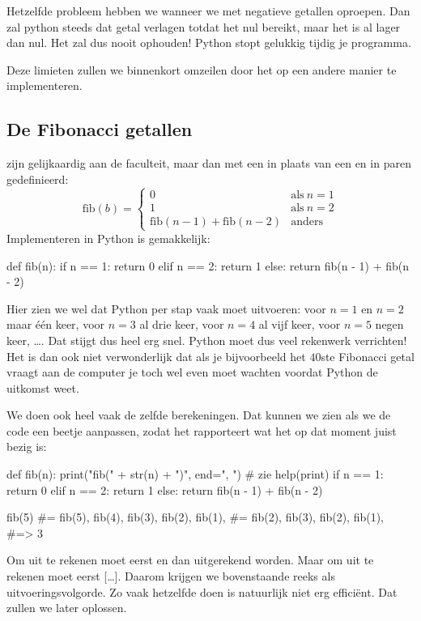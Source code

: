   Hetzelfde probleem hebben we wanneer we  met negatieve getallen
  oproepen. Dan zal python steeds dat getal verlagen totdat het nul bereikt,
  maar het is al lager dan nul. Het zal dus nooit ophouden! Python stopt
  gelukkig tijdig je programma.

  Deze limieten zullen we binnenkort omzeilen door het op een andere manier te
  implementeren.

  \subsection{De Fibonacci getallen} zijn gelijkaardig aan de faculteit, maar
  dan met een \py{+} in plaats van een \py{*} en in paren gedefinieerd:
  \begin{equation*}
    \text{fib}\left(b\right) = %
    \begin{cases}
      0                                                       & \text{als}\ n=1 \\
      1                                                       & \text{als}\ n=2 \\
      \text{fib}\left(n-1\right) + \text{fib}\left(n-2\right) & \text{anders}
    \end{cases}
  \end{equation*}
  Implementeren in Python is gemakkelijk:
  \begin{python}
    def fib(n):
      if n == 1: return 0
      elif n == 2: return 1
      else: return fib(n - 1) + fib(n - 2)
  \end{python}

  Hier zien we wel dat Python per stap vaak  moet uitvoeren: voor $n=1$
  en $n=2$ maar \'e\'en keer, voor $n=3$ al drie keer, voor $n=4$ al vijf keer,
  voor $n=5$ negen keer, \ldots. Dat stijgt dus heel erg snel. Python moet dus
  veel rekenwerk verrichten! Het is dan ook niet verwonderlijk dat als je
  bijvoorbeeld het $40$ste Fibonacci getal vraagt aan de computer je toch wel
  even moet wachten voordat Python de uitkomst weet.

  We doen ook heel vaak de zelfde berekeningen. Dat kunnen we zien als we de
  code een beetje aanpassen, zodat het rapporteert wat het op dat moment juist
  bezig is:
  \begin{python}
    def fib(n):
      print("fib(" + str(n) + ")", end=", ") # zie help(print)
      if n == 1:   return 0
      elif n == 2: return 1
      else:        return fib(n - 1) + fib(n - 2)
  \end{python}
  \begin{python}
    fib(5)
    #= fib(5), fib(4), fib(3), fib(2), fib(1),
    #=   fib(2), fib(3), fib(2), fib(1),
    #=> 3
  \end{python}
  Om  uit te rekenen moet eerst  en dan 
  uitgerekend worden. Maar om  uit te rekenen moet eerst [\ldots].
  Daarom krijgen we bovenstaande reeks als uitvoeringsvolgorde.
  Zo vaak hetzelfde doen is natuurlijk niet erg effici\"ent. Dat zullen we later
  oplossen.

